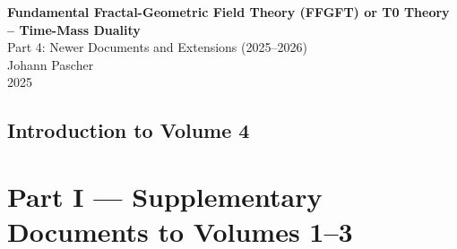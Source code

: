



	
	\setcounter{section}{0}
	\setcounter{subsection}{0}
	\setcounter{subsubsection}{0}
	\setcounter{paragraph}{0}
	
	\setcounter{secnumdepth}{1}  %
	\makeatletter
	\renewcommand*\l@part[2]{%
		\ifnum \c@tocdepth >-2\relax
		\addpenalty{-\@highpenalty}%
		\addvspace{0.8em \@plus\p@}%
		{\leftskip 0em \relax
			\rightskip \@tocrmarg
			\parfillskip -\rightskip
			\parindent 0em \relax\@afterindenttrue
			\interlinepenalty\@M
			\leavevmode
			{\footnotesize\bfseries #1}\nobreak
			\leaders\hbox{$\m@th\mkern \@dotsep mu\hbox{}\mkern \@dotsep mu$}\hfill
			\nobreak\hb@xt@\@pnumwidth{\hss #2}\par}%
		\addvspace{0.2em \@plus\p@}%
		\nobreak
		\fi}
	\makeatother
	
	\renewcommand{\cftchapfont}{\footnotesize\bfseries}
	\renewcommand{\cftchappagefont}{\footnotesize\bfseries}
	\setlength{\cftbeforechapskip}{0.3em}
	
	\setcounter{tocdepth}{0}
	\begin{titlepage}
		\centering
		\vspace*{2cm}
		
    {\Huge\textbf{Fundamental Fractal-Geometric Field Theory (FFGFT) or T0 Theory – Time-Mass Duality}}\\[1cm]
    {\Large Part 4: Newer Documents and Extensions (2025--2026)}\\[2cm]
		
		
		{\large Johann Pascher}\\[1cm]
		
		{\large 2025}
		
		\vfill
	\end{titlepage}
	
	\frontmatter
	\pagestyle{fancy}
	\makeatletter
	\let\ps@plain\ps@fancy
	\let\ps@empty\ps@fancy
	\makeatother
	
		\mainmatter
	\chapter{Introduction to Volume 4}
	
	
	\part{Part I --- Supplementary Documents to Volumes 1--3}
